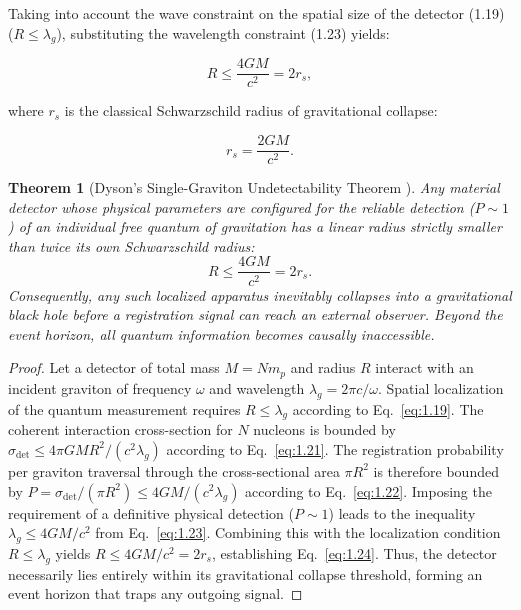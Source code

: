 \documentclass[11pt,a4paper]{article}
\newtheorem{theorem}{Theorem}[section]
\theoremstyle{definition}
\begin{document}
Taking into account the wave constraint on the spatial size of the detector (1.19) ($R \le \lambda_g$), substituting the wavelength constraint (1.23) yields:

\begin{equation}\label{eq:1.24}\tag{1.24}
R \le \frac{4 G M}{c^2} = 2 r_s,
\end{equation}

where $r_s$ is the classical Schwarzschild radius of gravitational collapse:

\begin{equation}\label{eq:1.25}\tag{1.25}
r_s = \frac{2GM}{c^2}.
\end{equation}

\begin{theorem}[Dyson's Single-Graviton Undetectability Theorem \cite{ref4}]\label{thm:dyson}
Any material detector whose physical parameters are configured for the reliable detection ($P \sim 1$) of an individual free quantum of gravitation has a linear radius strictly smaller than twice its own Schwarzschild radius:
\begin{equation*}
R \le \frac{4GM}{c^2} = 2 r_s.
\end{equation*}
Consequently, any such localized apparatus inevitably collapses into a gravitational black hole before a registration signal can reach an external observer. Beyond the event horizon, all quantum information becomes causally inaccessible.
\end{theorem}

\begin{proof}
Let a detector of total mass $M = N m_p$ and radius $R$ interact with an incident graviton of frequency $\omega$ and wavelength $\lambda_g = 2\pi c / \omega$. Spatial localization of the quantum measurement requires $R \le \lambda_g$ according to Eq.~\eqref{eq:1.19}. The coherent interaction cross-section for $N$ nucleons is bounded by $\sigma_{\text{det}} \le 4\pi G M R^2 / (c^2 \lambda_g)$ according to Eq.~\eqref{eq:1.21}. The registration probability per graviton traversal through the cross-sectional area $\pi R^2$ is therefore bounded by $P = \sigma_{\text{det}} / (\pi R^2) \le 4 G M / (c^2 \lambda_g)$ according to Eq.~\eqref{eq:1.22}. Imposing the requirement of a definitive physical detection ($P \sim 1$) leads to the inequality $\lambda_g \le 4GM / c^2$ from Eq.~\eqref{eq:1.23}. Combining this with the localization condition $R \le \lambda_g$ yields $R \le 4GM/c^2 = 2r_s$, establishing Eq.~\eqref{eq:1.24}. Thus, the detector necessarily lies entirely within its gravitational collapse threshold, forming an event horizon that traps any outgoing signal.
\end{proof}
\end{document}
